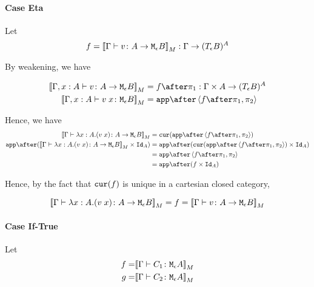 {%

    \paragraph{Case Eta}
    Let 
    \begin{equation}
        f = {\bf [\![}\Gamma \vdash v \colon A \rightarrow \texttt{M}_{\epsilon}{B}{\bf ]\!]}_M : \Gamma \rightarrow (T_{\epsilon}{B})^{A}
    \end{equation}

    By weakening, we have

    \begin{align}
        \deno{\typerelation{\gax}{v}{\aeb}} & = f \after \p : \G \times A \rightarrow (\teb)^A \\
        \deno{\typerelation{\gax}{\apply{v}{x}}{\meb}} & = \app\after\pr{f \after \p}{\pp} \\
    \end{align}

    Hence, we have 
    \begin{equation}
        \begin{split}
            \deno{\gtyperelation{\lam{x}{A}{(\apply{v}{x})}}{\aeb}} & = \cur{\app\after\pr{f \after \p}{\pp}}\\
            \app\after(\deno{\gtyperelation{\lam{x}{A}{(\apply{v}{x})}}{\aeb}} \times \Id{A}) & = \app \after(\cur{\app\after\pr{f \after \p}{\pp}}\times \Id{A})\\
            & = \app \after\pr{f\after\p}{\pp}\\
            & = \app\after(f\times\Id{A})
        \end{split}
    \end{equation}

    Hence, by the fact that $\texttt{cur}(f)$ is unique in a cartesian closed category, 

    \begin{equation}
        {\bf [\![}\Gamma \vdash \lambda x : A. (v\; x) \colon A \rightarrow \texttt{M}_{\epsilon}{B}{\bf ]\!]}_M = f ={\bf [\![}\Gamma \vdash v \colon A \rightarrow \texttt{M}_{\epsilon}{B}{\bf ]\!]}_M
    \end{equation}

    \paragraph{Case If-True}
    Let
    \begin{align}
        f = &{\bf [\![}\Gamma \vdash C_1 \colon \texttt{M}_{\epsilon}{A}{\bf ]\!]}_M\\
        g = &{\bf [\![}\Gamma \vdash C_2 \colon \texttt{M}_{\epsilon}{A}{\bf ]\!]}_M\\
    \end{align}

}
